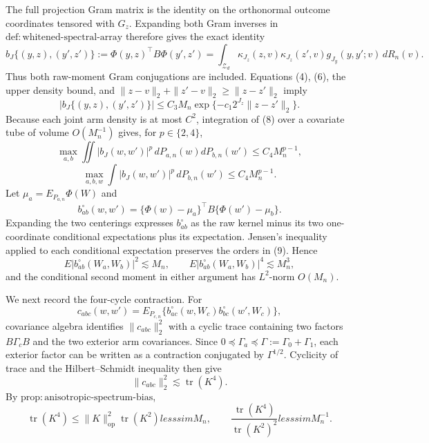 The full projection Gram matrix is the identity on the orthonormal outcome coordinates tensored with \(G_z\). Expanding both Gram inverses in \(\mathrm{def{:}whitened\text{-}spectral\text{-}array}\) therefore gives the exact identity
\[
b_J\{(y,z),(y',z')\}
:=\Phi(y,z)^{\top}B\Phi(y',z')
=\int_{\mathcal Z_d}\kappa_{J_z}(z,v)\kappa_{J_z}(z',v)
g_{J_y}(y,y';v)\,dR_n(v). \tag{7}
\]
Thus both raw-moment Gram conjugations are included. Equations (4), (6), the upper density bound, and \(\|z-v\|_2+\|z'-v\|_2\ge\|z-z'\|_2\) imply
\[
|b_J\{(y,z),(y',z')\}|
\le C_3M_n\exp\{-c_1 2^{J_z}\|z-z'\|_2\}. \tag{8}
\]
Because each joint arm density is at most \(C^2\), integration of (8) over a covariate tube of volume \(O(M_n^{-1})\) gives, for \(p\in\{2,4\}\),
\[
\max_{a,b}\iint|b_J(w,w')|^p\,dP_{a,n}(w)dP_{b,n}(w')
\le C_4M_n^{p-1},
\]
\[
\max_{a,b,w}\int|b_J(w,w')|^p\,dP_{b,n}(w')
\le C_4M_n^{p-1}. \tag{9}
\]
Let \(\mu_a=E_{P_{a,n}}\Phi(W)\) and
\[
b_{ab}^{\circ}(w,w')=
\{\Phi(w)-\mu_a\}^{\top}B\{\Phi(w')-\mu_b\}.
\]
Expanding the two centerings expresses \(b_{ab}^{\circ}\) as the raw kernel minus its two one-coordinate conditional expectations plus its expectation. Jensen's inequality applied to each conditional expectation preserves the orders in (9). Hence
\[
E|b_{ab}^{\circ}(W_a,W_b)|^2\lesssim M_n,
\qquad
E|b_{ab}^{\circ}(W_a,W_b)|^4\lesssim M_n^3, \tag{10}
\]
and the conditional second moment in either argument has \(L^2\)-norm \(O(M_n)\).

We next record the four-cycle contraction. For
\[
c_{abc}(w,w')=E_{P_{c,n}}
\{b_{ac}^{\circ}(w,W_c)b_{bc}^{\circ}(w',W_c)\},
\]
covariance algebra identifies \(\|c_{abc}\|_2^2\) with a cyclic trace containing two factors \(B\Gamma_cB\) and the two exterior arm covariances. Since \(0\preceq\Gamma_a\preceq\Gamma:=\Gamma_0+\Gamma_1\), each exterior factor can be written as a contraction conjugated by \(\Gamma^{1/2}\). Cyclicity of trace and the Hilbert--Schmidt inequality then give
\[
\|c_{abc}\|_2^2\lesssim\operatorname{tr}(K^4).
\]
By \(\mathrm{prop{:}anisotropic\text{-}spectrum\text{-}bias}\),
\[
\operatorname{tr}(K^4)
\le\|K\|_{\mathrm{op}}^2\operatorname{tr}(K^2)lesssim M_n,
\qquad
\frac{\operatorname{tr}(K^4)}{\operatorname{tr}(K^2)^2}lesssim M_n^{-1}. \tag{11}
\]

